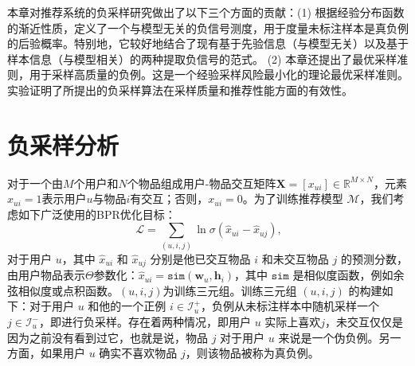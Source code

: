 本章对推荐系统的负采样研究做出了以下三个方面的贡献：(1) 根据经验分布函数的渐近性质，定义了一个与模型无关的负信号测度，用于度量未标注样本是真负例的后验概率。特别地，它较好地结合了现有基于先验信息（与模型无关）以及基于样本信息（与模型相关）的两种提取负信号的范式。 (2) 本章还提出了最优采样准则，用于采样高质量的负例。这是一个经验采样风险最小化的理论最优采样准则。实验证明了所提出的负采样算法在采样质量和推荐性能方面的有效性。

\section{负采样分析}
对于一个由$M$个用户和$N$个物品组成用户-物品交互矩阵$\mathbf{X}=[x_{ui}] \in \mathbb{R}^{M\times N}$，元素$x_{ui}=1$表示用户$u$与物品$i$有交互；否则，$x_{ui}=0$。为了训练推荐模型 $\mathcal{M}$，我们考虑如下广泛使用的BPR优化目标：
\begin{equation}\label{Eq:PairewiseLossFunction}\
	\mathcal{L} = \sum_{(u,i,j)} \ln \sigma(\hat{x}_{ui} - \hat{x}_{uj}) ,
\end{equation}
对于用户 $u$，其中 $\hat{x}_{ui}$ 和 $\hat{x}_{uj}$ 分别是他已交互物品 $i$ 和未交互物品 $j$ 的预测分数，由用户物品表示$\Theta$参数化：$\hat{x}_{ui} = \mathtt{sim}(\mathbf{w}_u, \mathbf{h}_i)$，其中 $\mathtt{sim}$ 是相似度函数，例如余弦相似度或点积函数。$(u,i,j)$为训练三元组。训练三元组 $(u,i,j)$ 的构建如下：对于用户 $u$ 和他的一个正例 $i \in \mathcal{I}_u^+$，负例从未标注样本中随机采样一个 $j \in \mathcal{I}_u^-$，即进行负采样。存在着两种情况，即用户 $u$ 实际上喜欢$j$，未交互仅仅是因为之前没有看到过它，也就是说，物品 $j$ 对于用户 $u$ 来说是一个伪负例。另一方面，如果用户 $u$ 确实不喜欢物品 $j$，则该物品被称为真负例。

